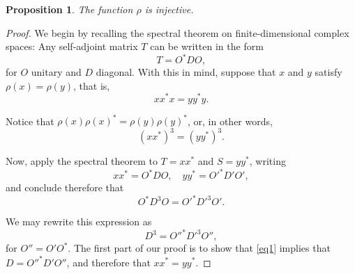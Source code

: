 \documentclass{article}
\theoremstyle{plain}
\newtheorem{prop}{Proposition}
\theoremstyle{nonumberplain}
\newtheorem{proof}{Proof}
\begin{document}
\begin{prop}
The function $\rho$ is injective.
\end{prop}

\begin{proof}
We begin by recalling the spectral theorem on finite-dimensional complex spaces: Any self-adjoint matrix $T$ can be written in the form
\[T = O^* D O,\]
for $O$ unitary and $D$ diagonal. With this in mind, suppose that $x$ and $y$ satisfy $\rho(x) = \rho(y)$, that is,
\[x x^* x = y y^* y.\]

Notice that $\rho(x) \rho(x)^* = \rho(y) \rho(y)^*$, or, in other words,
\[(x x^*)^3 = (y y^*)^3.\]

Now, apply the spectral theorem to $T = x x^*$ and $S = y y^*$, writing
\[x x^* = O^* D O, \quad y y^* = O'^* D' O',\]
and conclude therefore that
\[O^* D^3 O = O'^* D'^3 O'.\]

We may rewrite this expression as
\begin{equation}
D^3 = O''^* D'^3 O'',\label{eq1}
\end{equation}
for $O'' = O' O^*$. The first part of our proof is to show that \eqref{eq1} implies that $D = O''^* D' O''$, and therefore that $x x^* = y y^*$.


\end{proof}

\nocite{measurement}

{}

\end{document}
